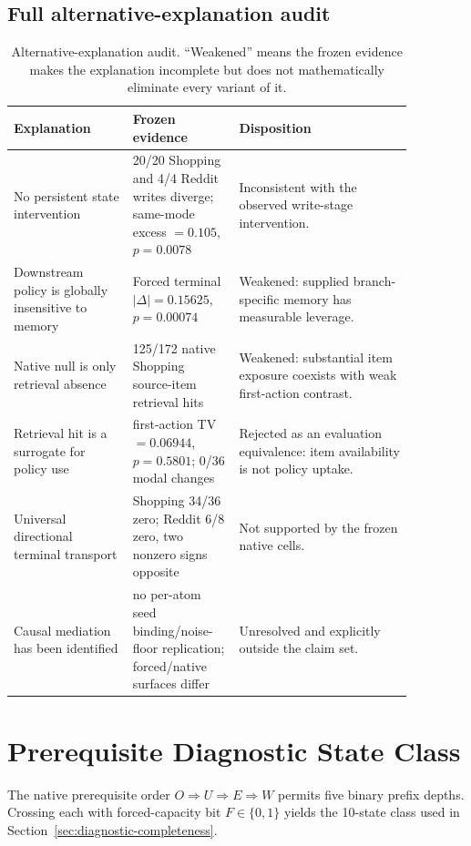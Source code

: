\subsection{Full alternative-explanation audit}
\begin{table}[h]
\centering
\small
\caption{Alternative-explanation audit. ``Weakened'' means the frozen evidence makes the explanation incomplete but does not mathematically eliminate every variant of it.}
\label{tab:alternative-audit}
\begin{tabular}{@{}p{0.26\linewidth}p{0.23\linewidth}p{0.38\linewidth}@{}}
\toprule
Explanation & Frozen evidence & Disposition \\
\midrule
No persistent state intervention & 20/20 Shopping and 4/4 Reddit writes diverge; same-mode excess $=0.105$, $p=0.0078$ & Inconsistent with the observed write-stage intervention. \\
Downstream policy is globally insensitive to memory & Forced terminal $|\Delta|=0.15625$, $p=0.00074$ & Weakened: supplied branch-specific memory has measurable leverage. \\
Native null is only retrieval absence & 125/172 native Shopping source-item retrieval hits & Weakened: substantial item exposure coexists with weak first-action contrast. \\
Retrieval hit is a surrogate for policy use & first-action TV $=0.06944$, $p=0.5801$; 0/36 modal changes & Rejected as an evaluation equivalence: item availability is not policy uptake. \\
Universal directional terminal transport & Shopping 34/36 zero; Reddit 6/8 zero, two nonzero signs opposite & Not supported by the frozen native cells. \\
Causal mediation has been identified & no per-atom seed binding/noise-floor replication; forced/native surfaces differ & Unresolved and explicitly outside the claim set. \\
\bottomrule
\end{tabular}
\end{table}

\section{Prerequisite Diagnostic State Class}
\label{sec:diagnostic-prefix-class}
The native prerequisite order $O\Rightarrow U\Rightarrow E\Rightarrow W$ permits five binary prefix depths. Crossing each with forced-capacity bit $F\in\{0,1\}$ yields the 10-state class used in Section~\ref{sec:diagnostic-completeness}.

